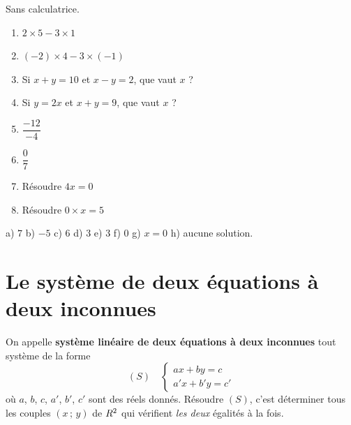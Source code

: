 \begin{automatismes}
Sans calculatrice.

\begin{enumerate}[label=\textbf{\alph*)}, leftmargin=*, itemsep=0.25em]
  \item $2\times5-3\times1$
  \item $(-2)\times4-3\times(-1)$
  \item Si $x+y = 10$ et $x-y = 2$, que vaut $x$ ?
  \item Si $y = 2x$ et $x+y = 9$, que vaut $x$ ?
  \item $\dfrac{-12}{-4}$
  \item $\dfrac{0}{7}$
  \item Résoudre $4x = 0$
  \item Résoudre $0\times x = 5$
\end{enumerate}
\end{automatismes}

\begin{corrige}[automatismes]
a) $7$ \quad b) $-5$ \quad c) $6$ \quad d) $3$ \quad e) $3$ \quad f) $0$
\quad g) $x = 0$ \quad h) aucune solution.
\end{corrige}

\section{Le système de deux équations à deux inconnues}

\begin{definition}
On appelle \textbf{système linéaire de deux équations à deux inconnues} tout
système de la forme
\[
  (S) \quad
  \begin{cases}
    ax+by = c\\
    a'x+b'y = c'
  \end{cases}
\]
où $a$, $b$, $c$, $a'$, $b'$, $c'$ sont des réels donnés. Résoudre $(S)$,
c'est déterminer tous les couples $(x\,;\,y)$ de $R^{2}$ qui vérifient
\emph{les deux} égalités à la fois.
\end{definition}

